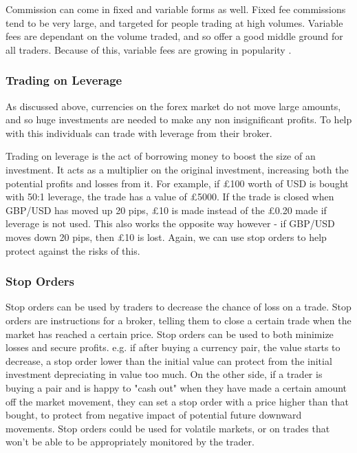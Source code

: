             Commission can come in fixed and variable forms as well. Fixed fee commissions tend to be very large, and targeted for people trading at high volumes. Variable fees are dependant on the volume traded, and so offer a good middle ground for all traders. Because of this, variable fees are growing in popularity \cite{llc_2016}. 



            \subsubsection{Trading on Leverage}
            As discussed above, currencies on the forex market do not move large amounts, and so huge investments are needed to make any non insignificant profits. To help with this individuals can trade with leverage from their broker. 
                        
            Trading on leverage is the act of borrowing money to boost the size of an investment. It acts as a multiplier on the original investment, increasing both the potential profits and losses from it. For example, if £100 worth of USD is bought with 50:1 leverage, the trade has a value of £5000. If the trade is closed when GBP/USD has moved up 20 pips, £10 is made instead of the £0.20 made if leverage is not used. \cite{lioudis_2018}This also works the opposite way however - if GBP/USD moves down 20 pips, then £10 is lost. Again, we can use stop orders to help protect against the risks of this. 



            \subsubsection{Stop Orders}
            Stop orders can be used by traders to decrease the chance of loss on a trade. Stop orders are instructions for a broker, telling them to close a certain trade when the market has reached a certain price. Stop orders can be used to both minimize losses and secure profits. e.g. if after buying a currency pair, the value starts to decrease, a stop order lower than the initial value can protect from the initial investment depreciating in value too much. On the other side, if a trader is buying a pair and is happy to "cash out" when they have made a certain amount off the market movement, they can set a stop order with a price higher than that bought, to protect from negative impact of potential future downward movements. Stop orders could be used for volatile markets, or on trades that won't be able to be appropriately monitored by the trader. \cite{momoh_2018}
            



